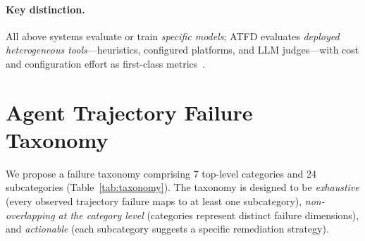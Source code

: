 \documentclass[11pt]{article}
\newcommand{\atfd}{\textsc{ATFD}\xspace}
\begin{document}
\paragraph{Key distinction.}
All above systems evaluate or train \emph{specific models}; \atfd
evaluates \emph{deployed heterogeneous tools}---heuristics, configured
platforms, and LLM judges---with cost and configuration effort as
first-class metrics~\citep{moshkovich2025beyond, arize2024failures}.

\section{Agent Trajectory Failure Taxonomy}
\label{sec:taxonomy}

We propose a failure taxonomy comprising 7 top-level categories and 24
subcategories (Table~\ref{tab:taxonomy}). The taxonomy is designed to be
\emph{exhaustive} (every observed trajectory failure maps to at least one
subcategory), \emph{non-overlapping at the category level} (categories
represent distinct failure dimensions), and \emph{actionable} (each
subcategory suggests a specific remediation strategy).
\end{document}
